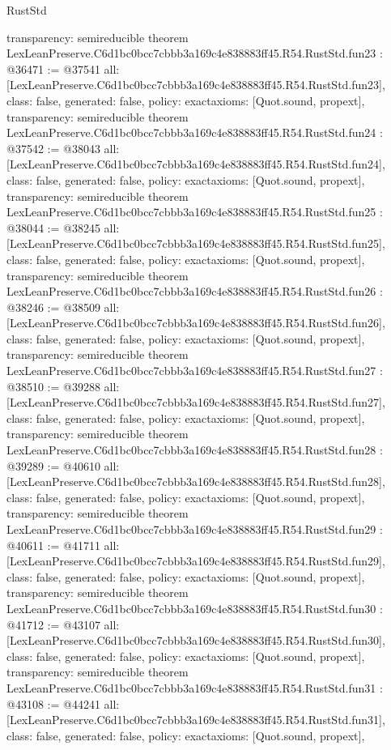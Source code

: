 \begin{lexlean}{RustStd}
\begin{coremodule}
{  transparency: semireducible
}
theorem LexLeanPreserve.C6d1bc0bcc7cbbb3a169c4e838883ff45.R54.RustStd.fun23 : @36471 := @37541 {
  all: [LexLeanPreserve.C6d1bc0bcc7cbbb3a169c4e838883ff45.R54.RustStd.fun23],
  class: false,
  generated: false,
  policy: exact{axioms: [Quot.sound, propext]},
  transparency: semireducible
}
theorem LexLeanPreserve.C6d1bc0bcc7cbbb3a169c4e838883ff45.R54.RustStd.fun24 : @37542 := @38043 {
  all: [LexLeanPreserve.C6d1bc0bcc7cbbb3a169c4e838883ff45.R54.RustStd.fun24],
  class: false,
  generated: false,
  policy: exact{axioms: [Quot.sound, propext]},
  transparency: semireducible
}
theorem LexLeanPreserve.C6d1bc0bcc7cbbb3a169c4e838883ff45.R54.RustStd.fun25 : @38044 := @38245 {
  all: [LexLeanPreserve.C6d1bc0bcc7cbbb3a169c4e838883ff45.R54.RustStd.fun25],
  class: false,
  generated: false,
  policy: exact{axioms: [Quot.sound, propext]},
  transparency: semireducible
}
theorem LexLeanPreserve.C6d1bc0bcc7cbbb3a169c4e838883ff45.R54.RustStd.fun26 : @38246 := @38509 {
  all: [LexLeanPreserve.C6d1bc0bcc7cbbb3a169c4e838883ff45.R54.RustStd.fun26],
  class: false,
  generated: false,
  policy: exact{axioms: [Quot.sound, propext]},
  transparency: semireducible
}
theorem LexLeanPreserve.C6d1bc0bcc7cbbb3a169c4e838883ff45.R54.RustStd.fun27 : @38510 := @39288 {
  all: [LexLeanPreserve.C6d1bc0bcc7cbbb3a169c4e838883ff45.R54.RustStd.fun27],
  class: false,
  generated: false,
  policy: exact{axioms: [Quot.sound, propext]},
  transparency: semireducible
}
theorem LexLeanPreserve.C6d1bc0bcc7cbbb3a169c4e838883ff45.R54.RustStd.fun28 : @39289 := @40610 {
  all: [LexLeanPreserve.C6d1bc0bcc7cbbb3a169c4e838883ff45.R54.RustStd.fun28],
  class: false,
  generated: false,
  policy: exact{axioms: [Quot.sound, propext]},
  transparency: semireducible
}
theorem LexLeanPreserve.C6d1bc0bcc7cbbb3a169c4e838883ff45.R54.RustStd.fun29 : @40611 := @41711 {
  all: [LexLeanPreserve.C6d1bc0bcc7cbbb3a169c4e838883ff45.R54.RustStd.fun29],
  class: false,
  generated: false,
  policy: exact{axioms: [Quot.sound, propext]},
  transparency: semireducible
}
theorem LexLeanPreserve.C6d1bc0bcc7cbbb3a169c4e838883ff45.R54.RustStd.fun30 : @41712 := @43107 {
  all: [LexLeanPreserve.C6d1bc0bcc7cbbb3a169c4e838883ff45.R54.RustStd.fun30],
  class: false,
  generated: false,
  policy: exact{axioms: [Quot.sound, propext]},
  transparency: semireducible
}
theorem LexLeanPreserve.C6d1bc0bcc7cbbb3a169c4e838883ff45.R54.RustStd.fun31 : @43108 := @44241 {
  all: [LexLeanPreserve.C6d1bc0bcc7cbbb3a169c4e838883ff45.R54.RustStd.fun31],
  class: false,
  generated: false,
  policy: exact{axioms: [Quot.sound, propext]},
}
\end{coremodule}
\end{lexlean}
